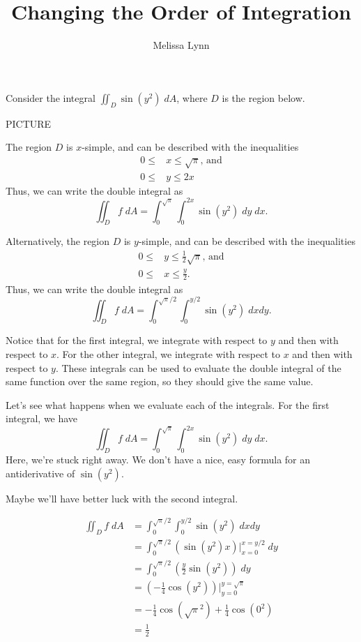 \documentclass{ximera}
\title{Changing the Order of Integration}
\author{Melissa Lynn}
\begin{document}
  
\begin{abstract}  
\end{abstract}  
\maketitle  

Consider the integral $\iint_D \sin(y^2)\;dA$, where $D$ is the region below.

PICTURE

The region $D$ is $x$-simple, and can be described with the inequalities
\begin{align*}
0\leq &x\leq \sqrt{\pi}\text{, and}\\
0\leq &y\leq 2x
\end{align*}
Thus, we can write the double integral as
\[
\iint_D f\;dA = \int_0^{\sqrt{\pi}}\int_0^{2x}\sin(y^2)\;dy\;dx.
\]

Alternatively, the region $D$ is $y$-simple, and can be described with the inequalities
\begin{align*}
0\leq &y\leq \frac{1}{2}\sqrt{\pi}\text{, and}\\
0\leq &x\leq \frac{y}{2}.
\end{align*}
Thus, we can write the double integral as
\[
\iint_D f\;dA = \int_0^{\sqrt{\pi}/2}\int_0^{y/2} \sin(y^2)\;dxdy.
\]

Notice that for the first integral, we integrate with respect to $y$ and then with respect to $x$. For the other integral, we integrate with respect to $x$ and then with respect to $y$. These integrals can be used to evaluate the double integral of the same function over the same region, so they should give the same value.

Let's see what happens when we evaluate each of the integrals. For the first integral, we have
\[
\iint_D f\;dA = \int_0^{\sqrt{\pi}}\int_0^{2x}\sin(y^2)\;dy\;dx.
\]
Here, we're stuck right away. We don't have a nice, easy formula for an antiderivative of $\sin(y^2)$.

Maybe we'll have better luck with the second integral.

\begin{align*}
\iint_D f\;dA &= \int_0^{\sqrt{\pi}/2}\int_0^{y/2} \sin(y^2)\;dxdy\\
&= \int_0^{\sqrt{\pi}/2}\left(\sin(y^2)x\right)|_{x=0}^{x=y/2}\;dy\\
&= \int_0^{\sqrt{\pi}/2}\left(\frac{y}{2}\sin(y^2)\right)\;dy\\
&= \left(-\frac{1}{4}\cos(y^2)\right)|_{y=0}^{y=\sqrt{\pi}}\\
&= -\frac{1}{4}\cos(\sqrt{\pi}^2) + \frac{1}{4}\cos(0^2)\\
&= \frac{1}{2}
\end{align*}
\end{document}
